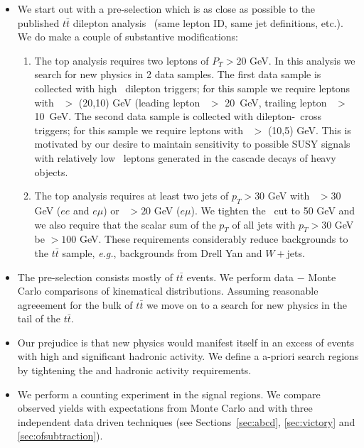 \begin{itemize}

\item We start out with a pre-selection which is as close as 
possible to the published $t\bar{t}$
dilepton analysis~\cite{ref:top} (same lepton ID, same jet definitions,
etc.).  We do make a couple of substantive modifications:

\begin{enumerate}
\item The top analysis requires two leptons of $P_T > 20$ GeV.  
In this analysis we search for new physics in 2 data samples. The first data
sample is collected with high \pt\ dilepton triggers; for this sample we require
leptons with \pt\ $>$ (20,10) GeV (leading lepton \pt\ $>$ 20~GeV,
trailing lepton \pt\ $>$ 10~GeV. The second data sample is collected
with dilepton-\Ht\ cross triggers; for this sample we require leptons
with \pt\ $>$ (10,5) GeV.  
This is motivated by our desire to maintain sensitivity to possible
SUSY signals with relatively low \pt\ leptons generated in the 
cascade decays of heavy objects.
\item The top analysis requires at least two jets of $p_T > 30$
GeV with \met\ $>30$ GeV ($ee$ and $e\mu$) or \met\ $>20$ GeV ($e\mu$).
We tighten the \met\ cut to 50 GeV and we 
also require that the scalar sum of the $p_T$ of all jets with $p_T > 30$
GeV be $> 100$ GeV.  These requirements considerably
reduce backgrounds to the $t\bar{t}$ sample, {\em e.g.}, backgrounds
from Drell Yan and $W+$jets.
\end{enumerate}

\item The pre-selection consists mostly of $t\bar{t}$ events.  We perform 
data $-$ Monte Carlo comparisons of kinematical distributions.  Assuming
reasonable agreeement for the bulk of $t\bar{t}$ we move on to a 
search for new physics in the tail of the $t\bar{t}$.

\item Our prejudice is that new physics would manifest itself in an
excess of events with high \met and significant hadronic activity.
We define a a-priori search regions by tightening the \met and 
hadronic activity requirements.

\item We perform a counting experiment in the signal regions.  We compare
observed yields with expectations from Monte Carlo and with three independent
data driven techniques (see Sections~\ref{sec:abcd}, \ref{sec:victory} and \ref{sec:ofsubtraction}).

\end{itemize}



